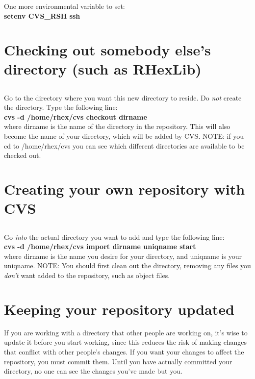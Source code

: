 \documentclass[12pt, letterpaper]{article}
\begin{document}
  \subsection{} 
One more environmental variable to set:\\
      {\bf setenv CVS\_RSH ssh }



\section{Checking out somebody else's directory (such as RHexLib)}
  \subsection{} 
Go to the directory where you want this new directory to
reside. Do {\it not} create the directory. Type the following line:\\
      {\bf cvs -d /home/rhex/cvs checkout dirname }\\
where dirname is the name of the directory in the
repository. This will also become the name of your directory, which
will be added by CVS. NOTE: if you cd to /home/rhex/cvs you can see
which different directories are available to be checked out.



\section{Creating your own repository with CVS}
  \subsection{} 
Go {\it into } the actual directory you want to add and type the
following line:\\
      {\bf cvs -d /home/rhex/cvs import dirname uniqname start }\\
where dirname is the name you desire for your directory, and
uniqname is your uniqname. NOTE: You should first clean out the
directory, removing any files you {\it don't } want added to the
repository, such as object files.



\section{Keeping your repository updated}
If you are working with a directory that other people are working on,
it's wise to update it before you start working, since this reduces
the risk of making changes that conflict with other people's
changes. If you want your changes to affect the repository, you must
commit them. Until you have actually committed your directory, no one
can see the changes you've made but you.
\end{document}
